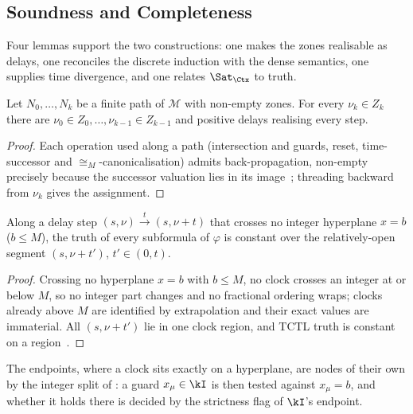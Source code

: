\subsection{Soundness and Completeness}\label{ss:sound}

Four lemmas support the two constructions: one makes the zones realisable as delays, one reconciles
the discrete induction with the dense semantics, one supplies time divergence, and one relates
$\Sat_{\Ctx}$ to truth.

\begin{lemma}\label{lem:feasible}
Let $N_0,\dots,N_k$ be a finite path of $\mathcal{M}$ with non-empty zones. For every $\nu_k\in Z_k$
there are $\nu_0\in Z_0,\dots,\nu_{k-1}\in Z_{k-1}$ and positive delays realising every step.
\end{lemma}
\begin{proof}
Each operation used along a path (intersection and guards, reset, time-successor and
$\cong_M$-canonicalisation) admits back-propagation, non-empty precisely because the successor
valuation lies in its image~\cite{Bouyer05TimedAutomata}; threading backward from $\nu_k$ gives the
assignment.
\end{proof}

\begin{lemma}\label{lem:stability}
Along a delay step $(s,\nu)\xrightarrow{t}(s,\nu+t)$ that crosses no integer hyperplane $x=b$
($b\le M$), the truth of every subformula of $\varphi$ is constant over the relatively-open segment
$(s,\nu+t')$, $t'\in(0,t)$.
\end{lemma}
\begin{proof}
Crossing no hyperplane $x=b$ with $b\le M$, no clock crosses an integer at or below $M$, so no integer
part changes and no fractional ordering wraps; clocks already above $M$ are identified by
extrapolation and their exact values are immaterial. All $(s,\nu+t')$ lie in one clock region, and
TCTL truth is constant on a region~\cite{AlurCourcoubetisDill1990,Bouyer05TimedAutomata}.
\end{proof}
\noindent
The endpoints, where a clock sits exactly on a hyperplane, are nodes of their own by the integer split
of : a guard $x_\mu\in\kI$ is then tested against $x_\mu=b$, and whether it holds there
is decided by the strictness flag of $\kI$'s endpoint.


